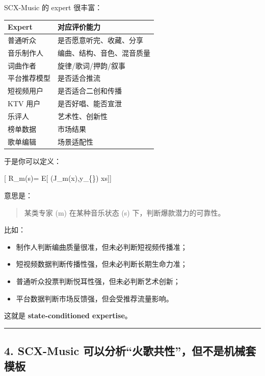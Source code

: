 \documentclass[
  12pt,
]{ctexart}
\providecommand{\tightlist}{%
  \setlength{\itemsep}{0pt}\setlength{\parskip}{0pt}}
\begin{document}
SCX-Music 的 expert 很丰富：

\begin{longtable}[]{@{}ll@{}}
\toprule\noalign{}
Expert & 对应评价能力 \\
\midrule\noalign{}
\endhead
\bottomrule\noalign{}
\endlastfoot
普通听众 & 是否愿意听完、收藏、分享 \\
音乐制作人 & 编曲、结构、音色、混音质量 \\
词曲作者 & 旋律/歌词/押韵/叙事 \\
平台推荐模型 & 是否适合推流 \\
短视频用户 & 是否适合二创和传播 \\
KTV 用户 & 是否好唱、能否宣泄 \\
乐评人 & 艺术性、创新性 \\
榜单数据 & 市场结果 \\
歌单编辑 & 场景适配性 \\
\end{longtable}

于是你可以定义：

{[} R\_m(s)= \mathbb E{[} \ell(J\_m(x),y\_\{\})
\mid x\in s{]}{]}

意思是：

\begin{quote}
某类专家 (m) 在某种音乐状态 (s) 下，判断爆款潜力的可靠性。
\end{quote}

比如：

\begin{itemize}
\tightlist
\item
  制作人判断编曲质量很准，但未必判断短视频传播准；
\item
  短视频数据判断传播性强，但未必判断长期生命力准；
\item
  普通听众投票判断悦耳性强，但未必判断艺术创新；
\item
  平台数据判断市场反馈强，但会受推荐流量影响。
\end{itemize}

这就是 \textbf{state-conditioned expertise}。

\begin{center}\rule{0.5\linewidth}{0.5pt}\end{center}

\subsection{4. SCX-Music
可以分析``火歌共性''，但不是机械套模板}\label{scx-music-ux53efux4ee5ux5206ux6790ux706bux6b4cux5171ux6027ux4f46ux4e0dux662fux673aux68b0ux5957ux6a21ux677f}
\end{document}
